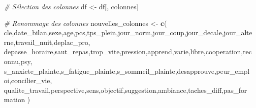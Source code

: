 \documentclass[
]{article}
\newenvironment{Shaded}{\begin{snugshade}}{\end{snugshade}}
\newcommand{\CommentTok}[1]{\textcolor[rgb]{0.56,0.35,0.01}{\textit{#1}}}
\newcommand{\FunctionTok}[1]{\textcolor[rgb]{0.13,0.29,0.53}{\textbf{#1}}}
\newcommand{\NormalTok}[1]{#1}
\newcommand{\OtherTok}[1]{\textcolor[rgb]{0.56,0.35,0.01}{#1}}
\newcommand{\StringTok}[1]{\textcolor[rgb]{0.31,0.60,0.02}{#1}}
\begin{document}
\begin{Shaded}
\begin{Highlighting}[]
\CommentTok{\# Sélection des colonnes}
\NormalTok{df }\OtherTok{\textless{}{-}}\NormalTok{ df[, colonnes]}

\CommentTok{\# Renommage des colonnes}
\NormalTok{nouvelles\_colonnes }\OtherTok{\textless{}{-}} \FunctionTok{c}\NormalTok{(}
  \StringTok{\textquotesingle{}cle\textquotesingle{}}\NormalTok{,}\StringTok{\textquotesingle{}date\_bilan\textquotesingle{}}\NormalTok{,}\StringTok{\textquotesingle{}sexe\textquotesingle{}}\NormalTok{,}\StringTok{\textquotesingle{}age\textquotesingle{}}\NormalTok{,}\StringTok{\textquotesingle{}pcs\textquotesingle{}}\NormalTok{,}\StringTok{\textquotesingle{}tps\_plein\textquotesingle{}}\NormalTok{,}\StringTok{\textquotesingle{}jour\_norm\textquotesingle{}}\NormalTok{,}\StringTok{\textquotesingle{}jour\_coup\textquotesingle{}}\NormalTok{,}\StringTok{\textquotesingle{}jour\_decale\textquotesingle{}}\NormalTok{,}\StringTok{\textquotesingle{}jour\_alterne\textquotesingle{}}\NormalTok{,}\StringTok{\textquotesingle{}travail\_nuit\textquotesingle{}}\NormalTok{,}\StringTok{\textquotesingle{}deplac\_pro\textquotesingle{}}\NormalTok{,}
  \StringTok{\textquotesingle{}depasse\_horaire\textquotesingle{}}\NormalTok{,}\StringTok{\textquotesingle{}saut\_repas\textquotesingle{}}\NormalTok{,}\StringTok{\textquotesingle{}trop\_vite\textquotesingle{}}\NormalTok{,}\StringTok{\textquotesingle{}pression\textquotesingle{}}\NormalTok{,}\StringTok{\textquotesingle{}apprend\textquotesingle{}}\NormalTok{,}\StringTok{\textquotesingle{}varie\textquotesingle{}}\NormalTok{,}\StringTok{\textquotesingle{}libre\textquotesingle{}}\NormalTok{,}\StringTok{\textquotesingle{}cooperation\textquotesingle{}}\NormalTok{,}\StringTok{\textquotesingle{}reconnu\textquotesingle{}}\NormalTok{,}\StringTok{\textquotesingle{}psy\textquotesingle{}}\NormalTok{,}
  \StringTok{\textquotesingle{}s\_anxiete\_plainte\textquotesingle{}}\NormalTok{,}\StringTok{\textquotesingle{}s\_fatigue\_plainte\textquotesingle{}}\NormalTok{,}\StringTok{\textquotesingle{}s\_sommeil\_plainte\textquotesingle{}}\NormalTok{,}\StringTok{\textquotesingle{}desapprouve\textquotesingle{}}\NormalTok{,}\StringTok{\textquotesingle{}peur\_emploi\textquotesingle{}}\NormalTok{,}\StringTok{\textquotesingle{}concilier\_vie\textquotesingle{}}\NormalTok{,}
  \StringTok{\textquotesingle{}qualite\_travail\textquotesingle{}}\NormalTok{,}\StringTok{\textquotesingle{}perspective\textquotesingle{}}\NormalTok{,}\StringTok{\textquotesingle{}sens\textquotesingle{}}\NormalTok{,}\StringTok{\textquotesingle{}objectif\textquotesingle{}}\NormalTok{,}\StringTok{\textquotesingle{}suggestion\textquotesingle{}}\NormalTok{,}\StringTok{\textquotesingle{}ambiance\textquotesingle{}}\NormalTok{,}\StringTok{\textquotesingle{}taches\_diff\textquotesingle{}}\NormalTok{,}\StringTok{\textquotesingle{}pas\_formation\textquotesingle{}}
\NormalTok{)}


\end{Highlighting}
\end{Shaded}
\end{document}
